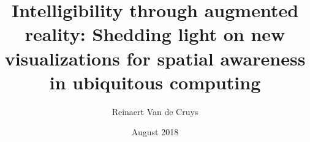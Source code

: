 \documentclass[]{report}
\begin{document}
\title{Intelligibility through augmented reality: Shedding light on new visualizations for spatial awareness in ubiquitous computing}
\author{Reinaert Van de Cruys}
\date{August 2018}
\maketitle



\tableofcontents








\printbibliography

\appendix


\end{document}
